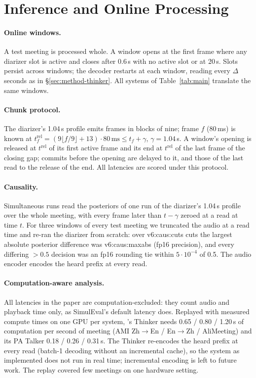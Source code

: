 \section{Inference and Online Processing}
\label{app:online}
\label{app:chunk}
\label{app:causal}

\paragraph{Online windows.} A test meeting is processed whole. A window opens at the first frame where any diarizer
slot is active and closes after 0.6\,s with no active slot or at 20\,s. Slots persist across windows; the decoder
restarts at each window, reading every $\Delta$ seconds as in \S\ref{sec:method-thinker}. All systems of
Table~\ref{tab:main} translate the same windows.

\paragraph{Chunk protocol.} The diarizer's 1.04\,s profile emits frames in blocks of nine; frame $f$ (80\,ms) is known
at $t^{\mathrm{rel}}_f=(9\lfloor f/9\rfloor+13)\cdot 80\,\text{ms}\le t_f+\gamma$, $\gamma=1.04$\,s. A window's opening is
released at $t^{\mathrm{rel}}$ of its first active frame and its end at $t^{\mathrm{rel}}$ of the last frame of the
closing gap; commits before the opening are delayed to it, and those of the last read to the release of the end. All
latencies are scored under this protocol.

\paragraph{Causality.} Simultaneous runs read the posteriors of one run of the diarizer's 1.04\,s profile over the
whole meeting, with every frame later than $t-\gamma$ zeroed at a read at time $t$. For three windows of every test
meeting we truncated the audio at a read time and re-ran the diarizer from scratch: over \num{v6:caus:cuts} cuts the
largest absolute posterior difference was \num{v6:caus:maxabs} (fp16 precision), and every differing $>0.5$ decision
was an fp16 rounding tie within $5\cdot10^{-4}$ of 0.5. The audio encoder encodes the heard prefix at every read.

\paragraph{Computation-aware analysis.} All latencies in the paper are computation-excluded: they count audio and
playback time only, as SimulEval's default latency does. Replayed with measured compute times on one GPU per system,
\sys{}'s Thinker needs 0.65 / 0.80 / 1.20\,s of computation per second of meeting (AMI Zh$\rightarrow$En /
En$\rightarrow$Zh / AliMeeting) and its PA Talker 0.18 / 0.26 / 0.31\,s. The Thinker re-encodes the heard prefix at every
read (batch-1 decoding without an incremental cache), so the system as implemented does not run in real time;
incremental encoding is left to future work. The replay covered few meetings on one hardware setting.

